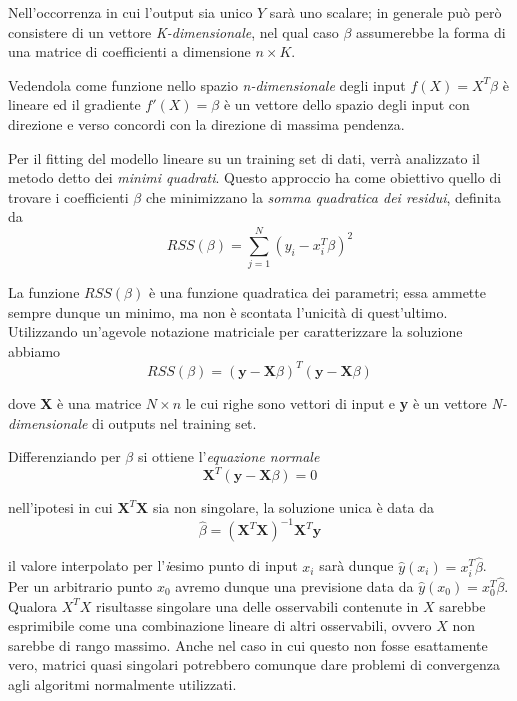 \documentclass[12pt,openright,twoside,a4paper]{book}
\begin{document}
Nell'occorrenza in cui l'output sia unico $Y$ sarà uno scalare; in generale può però consistere di un vettore \textit{K-dimensionale}, nel qual caso $\beta$ assumerebbe la forma di una matrice di coefficienti a dimensione $n\times K$.

Vedendola come funzione nello spazio \textit{n-dimensionale} degli input $f(X)=X^T\beta$ è lineare ed il gradiente $f'(X)=\beta$ è un vettore dello spazio degli input con direzione e verso concordi con la direzione di massima pendenza.

Per il fitting del modello lineare su un training set di dati, verrà analizzato il metodo detto dei \textit{minimi quadrati}.
Questo approccio ha come obiettivo quello di trovare i coefficienti $\beta$ che minimizzano la \textit{somma quadratica dei residui}, definita da
\begin{equation}
RSS(\beta)=\sum_{j=1}^{N}(y_i-x_i^T\beta)^2
\end{equation}

La funzione $RSS(\beta)$ è una funzione quadratica dei parametri; essa ammette sempre dunque un minimo, ma non è scontata l'unicità di quest'ultimo.
Utilizzando un'agevole notazione matriciale per caratterizzare la soluzione abbiamo
\begin{equation}
RSS(\beta)=(\textbf{y}-\textbf{X}\beta)^T(\textbf{y}-\textbf{X}\beta)
\end{equation}

dove \textbf{X} è una matrice $N \times n$ le cui righe sono vettori di input e \textbf{y} è un vettore \textit{N-dimensionale} di outputs nel training set.

Differenziando per $\beta$ si ottiene l'\textit{equazione normale}
\begin{equation}
\textbf{X}^T(\textbf{y}-\textbf{X}\beta)=0
\end{equation}

nell'ipotesi in cui $\textbf{X}^T\textbf{X}$ sia non singolare, la soluzione unica è data da
\begin{equation}
\hat{\beta}=(\textbf{X}^T\textbf{X})^{-1}\textbf{X}^T\textbf{y}
\end{equation}

il valore interpolato per l'\textit{i}esimo punto di input $x_i$ sarà dunque $\hat{y}(x_i)=x_i^T\hat{\beta}$. Per un arbitrario punto $x_0$ avremo dunque una previsione data da $\hat{y}(x_0)=x_0^T\hat{\beta}$. \cite{ESL}
Qualora $X^TX$ risultasse singolare una delle osservabili contenute in $X$ sarebbe esprimibile come una combinazione lineare di altri osservabili, ovvero $X$ non sarebbe di rango massimo. Anche nel caso in cui questo non fosse esattamente vero, matrici quasi singolari potrebbero comunque dare problemi di convergenza agli algoritmi normalmente utilizzati.
\end{document}
